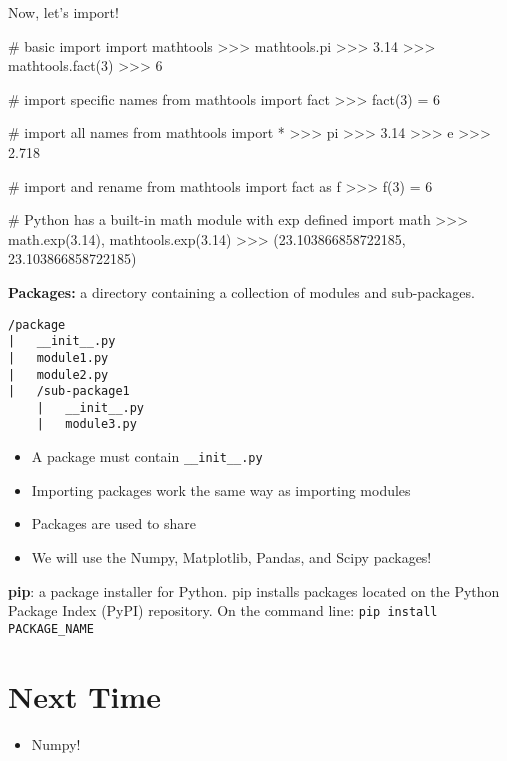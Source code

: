 \documentclass[12pt]{article}
\numberwithin{equation}{section}
\begin{document}
Now, let's import!

\begin{python}
# basic import
import mathtools
>>> mathtools.pi
>>> 3.14
>>> mathtools.fact(3)
>>> 6

# import specific names
from mathtools import fact
>>> fact(3) = 6

# import all names
from mathtools import *
>>> pi
>>> 3.14
>>> e
>>> 2.718

# import and rename
from mathtools import fact as f
>>> f(3) = 6

# Python has a built-in math module with exp defined
import math
>>> math.exp(3.14), mathtools.exp(3.14)
>>> (23.103866858722185, 23.103866858722185)
	
\end{python}

\textbf{Packages: }a directory containing a collection of modules and sub-packages.
\begin{verbatim}
/package
|   __init__.py
|   module1.py
|   module2.py
|   /sub-package1
    |   __init__.py
    |   module3.py
\end{verbatim}
\begin{itemize}
    \item A package must contain \verb|__init__.py| 
    \item Importing packages work the same way as importing modules
    \item Packages are used to share 
    \item We will use the Numpy, Matplotlib, Pandas, and Scipy packages!
\end{itemize}

\textbf{pip}: a package installer for Python. pip installs packages located on the Python Package Index (PyPI) repository. On the command line: \verb|pip install PACKAGE_NAME|

\section{Next Time}
\begin{itemize}
    \item Numpy!
\end{itemize}
\end{document}
